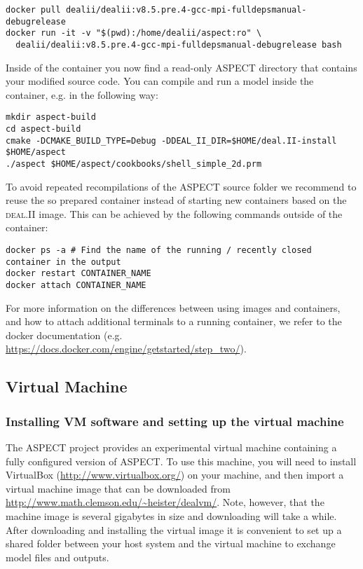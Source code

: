 \documentclass{article}
\newcommand{\dealii}{{\textsc{deal.II}}}
\newcommand{\aspect}{\textsc{ASPECT}}
\begin{document}
\begin{lstlisting}[frame=single,language=ksh,showstringspaces=false]
docker pull dealii/dealii:v8.5.pre.4-gcc-mpi-fulldepsmanual-debugrelease
docker run -it -v "$(pwd):/home/dealii/aspect:ro" \
  dealii/dealii:v8.5.pre.4-gcc-mpi-fulldepsmanual-debugrelease bash
\end{lstlisting}

Inside of the container you now find a read-only \aspect{} directory that
contains your modified source code. You can compile and run a model inside the
container, e.g. in the following way:

\begin{lstlisting}[frame=single,language=ksh]
mkdir aspect-build
cd aspect-build
cmake -DCMAKE_BUILD_TYPE=Debug -DDEAL_II_DIR=$HOME/deal.II-install $HOME/aspect
./aspect $HOME/aspect/cookbooks/shell_simple_2d.prm
\end{lstlisting}

To avoid repeated recompilations of the \aspect{} source folder we recommend to
reuse the so prepared container instead of starting new containers based on the
\dealii{} image. This can be achieved by the following commands outside of the
container:

\begin{lstlisting}[frame=single,language=ksh]
docker ps -a # Find the name of the running / recently closed container in the output
docker restart CONTAINER_NAME
docker attach CONTAINER_NAME
\end{lstlisting}

For more information on the differences between using images and containers,
and how to attach additional terminals to a running container, we refer to the
docker documentation (e.g.
\url{https://docs.docker.com/engine/getstarted/step_two/}).

\subsection{Virtual Machine}

\subsubsection{Installing VM software and setting up the virtual machine}

The \aspect{} project provides an experimental virtual machine containing a
fully configured version of \aspect{}. To use this machine, you will need to
install VirtualBox (\url{http://www.virtualbox.org/}) on your machine, and then
import a virtual machine image that can be downloaded from
\url{http://www.math.clemson.edu/~heister/dealvm/}. Note, however, that the
machine image is several gigabytes in size and downloading will take a while.
After downloading and installing the virtual image it is convenient to set up a
shared folder between your host system and the virtual machine to exchange model
files and outputs.
\end{document}
